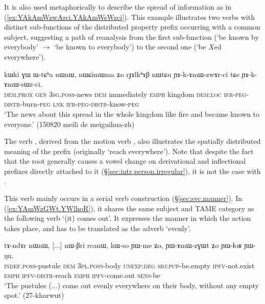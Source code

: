 It is also used metaphorically to describe the spread of information as in (\ref{ex:YAkAmWzwArci.YAkAmWsWzci}). This example illustrates two verbs with distinct sub-functions of the distributed property  prefix occurring with a common subject, suggesting a path of reanalysis from the first sub-function (`be known by everybody'  $\rightarrow$ `be known to everybody') to the second one (`be $X$ed everywhere').

 \begin{exe}
\ex \label{ex:YAkAmWzwArci.YAkAmWsWzci}
 \gll kɯki ɣɯ ɯ-tɕʰa nɯnɯ, nɯɕimɯma ʑo rɟɤlkʰɤβ nɯtɕu ɲɤ-k-ɤmɯ-zwɤr-ci tɕe ɲɤ-k-ɤmɯ-sɯz-ci. \\
 \textsc{dem}.\textsc{prox} \textsc{gen} \textsc{3sg}.\textsc{poss}-news \textsc{dem} immediately \textsc{emph} kingdom \textsc{dem}:\textsc{loc} \textsc{ifr}-\textsc{peg}-\textsc{distr}-burn-\textsc{peg} \textsc{lnk} \textsc{ifr}-\textsc{peg}-\textsc{distr}-know-\textsc{peg} \\
 \glt `The news about this spread in the whole kingdom like fire and became known to everyone.' (150820 meili de meiguihua-zh) 
\end{exe}

The verb , derived from the motion verb , also illustrates the spatially distributed meaning  of the prefix  (originally `reach everywhere'). Note that despite the fact that the root  generally causes a  \fl{}  vowel change on derivational and inflectional prefixes directly attached to it (§\ref{sec:intr.person.irregular}), it is not the case with .

This verb  mainly occurs in a serial verb construction (§\ref{sec:svc.manner}). In  (\ref{ex:YAmWzGWt.YWlhoR}), it shares the same subject and TAME category as the following verb  `(it) comes out'. It expresses the manner in which the action takes place, and has to be translated as the adverb `evenly'.

\begin{exe}
\ex \label{ex:YAmWzGWt.YWlhoR}
\gll  tɤ-ndɤr nɯnɯ, [...] nɯ-βri rcanɯ, kɯ-so ɲɯ-me ʑo, ɲɯ-ɤmɯ-zɣɯt ʑo ɲɯ-ɬoʁ ɲɯ-ŋu. \\
\textsc{indef}.\textsc{poss}-pustule \textsc{dem} { } \textsc{3pl}.\textsc{poss}-body \textsc{unexp}:\textsc{deg} \textsc{sbj}:\textsc{pcp}-be.empty \textsc{ipfv}-not.exist \textsc{emph} \textsc{ipfv}-\textsc{distr}-reach \textsc{emph} \textsc{ipfv}-come.out \textsc{sens}-be \\
\glt `The pustules (...) come out evenly everywhere on their body, without any empty spot.' (27-kharwut) 
\end{exe} 

